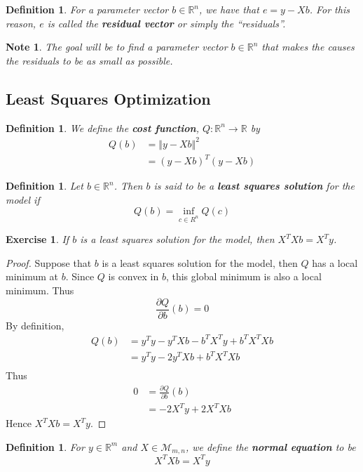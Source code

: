 \documentclass[12pt]{amsart}
\newtheorem{defn}[thm]{Definition}
\newtheorem{note}[thm]{Note}
\newtheorem{ex}[thm]{Exercise}
\newcommand{\R}{\mathbb{R}}
\newcommand{\MM}{\mathcal{M}}
\newcommand{\n}{\Vert}
\begin{document}
\begin{defn}
For a parameter vector $b \in \R^n$, we have that  $e = y-Xb$. For this reason, $e$ is called the \textbf{residual vector} or simply the ``residuals''.
\end{defn}

\begin{note}
The goal will be to find a parameter vector $b \in \R^n$ that makes the causes the residuals to be as small as possible.  
\end{note}

\subsection{Least Squares Optimization}

\begin{defn}
We define the \textbf{cost function}, $Q: \R^n \rightarrow \R$ by 
\begin{align*}
Q(b) 
&= \n y - Xb \n ^2 \\
&= (y - Xb )^T(y - Xb )
\end{align*}
\end{defn}

\begin{defn}
Let $b \in \R^n$. Then $b$ is said to be a \textbf{least squares solution} for the model if $$Q(b) = \inf_{c \in R^{n}} Q(c)$$ 
\end{defn}

\begin{ex}
If $b$ is a least squares solution for the model, then $X^TXb = X^Ty$.
\end{ex}

\begin{proof}
Suppose that $b$ is a least squares solution for the model, then $Q$ has a local minimum at $b$. Since $Q$ is convex in $b$, this global minimum is also a local minimum. Thus $$\frac{\partial Q}{\partial b}(b) = 0$$ By definition, 
\begin{align*}
Q(b) 
&= y^Ty -y^TXb - b^TX^Ty + b^TX^TXb \\
&= y^Ty -2y^TXb + b^TX^TXb \\ 
\end{align*}
Thus 
\begin{align*}
0
&= \frac{\partial Q}{\partial b}(b) \\
&= -2X^Ty + 2X^TXb
\end{align*}
Hence $X^TXb = X^Ty$.
\end{proof}

\begin{defn}
For $y \in \R^m$ and $X \in \MM_{m,n}$, we define the \textbf{normal equation} to be $$X^TXb = X^Ty$$
\end{defn}
\end{document}
